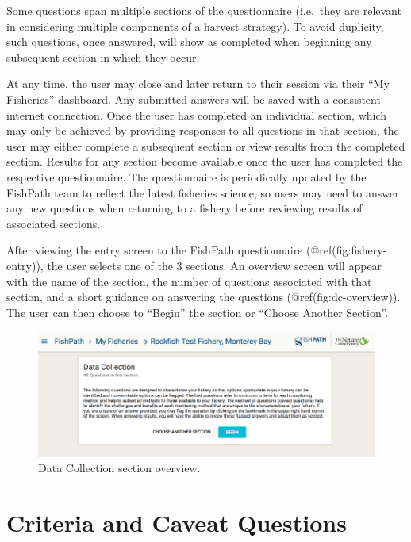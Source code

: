\documentclass[11pt,]{book}
\begin{document}
Some questions span multiple sections of the questionnaire (i.e.~they
are relevant in considering multiple components of a harvest strategy).
To avoid duplicity, such questions, once answered, will show as
completed when beginning any subsequent section in which they occur.

At any time, the user may close and later return to their session via
their ``My Fisheries'' dashboard. Any submitted answers will be saved
with a consistent internet connection. Once the user has completed an
individual section, which may only be achieved by providing responses to
all questions in that section, the user may either complete a subsequent
section or view results from the completed section. Results for any
section become available once the user has completed the respective
questionnaire. The questionnaire is periodically updated by the FishPath
team to reflect the latest fisheries science, so users may need to
answer any new questions when returning to a fishery before reviewing
results of associated sections.

After viewing the entry screen to the FishPath questionnaire
(@ref(fig:fishery-entry)), the user selects one of the 3 sections. An
overview screen will appear with the name of the section, the number of
questions associated with that section, and a short guidance on
answering the questions (@ref(fig:dc-overview)). The user can then
choose to ``Begin'' the section or ``Choose Another Section''.

\begin{figure}

{\centering \includegraphics[width=0.95\linewidth]{images/dc-overview} 

}

\caption{Data Collection section overview.}\label{fig:dc-overview}
\end{figure}

\hypertarget{criteria-and-caveat-questions}{%
\section{Criteria and Caveat
Questions}\label{criteria-and-caveat-questions}}
\end{document}

